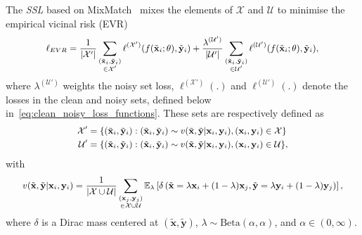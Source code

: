 \documentclass[review]{elsarticle}
\begin{document}
The \textit{SSL} based on MixMatch~\cite{berthelot2019mixmatch} mixes the elements of $\mathcal{X}$ and $\mathcal{U}$ to minimise the empirical vicinal risk (EVR)~\cite{zhang2017mixup}
\begin{equation}
\small
\begin{split}
\ell_{EVR} =  \frac{1}{|\mathcal{X}'|}\sum_{\substack{(\tilde{\mathbf{x}}_i,\tilde{\mathbf{y}}_i) \\ \in \mathcal{X}'}} \ell^{(\mathcal{X}')}(f(\tilde{\mathbf{x}}_i;\theta),\tilde{\mathbf{y}}_i) + 
 \frac{\lambda^{(\mathcal{U}')}}{|\mathcal{U}'|}\sum_{\substack{(\tilde{\mathbf{x}}_i,\tilde{\mathbf{y}}_i) \\ \in \mathcal{U}'}} \ell^{(\mathcal{U}')}(f(\tilde{\mathbf{x}}_i;\theta),\tilde{\mathbf{y}}_i),
\end{split}
\label{eq:EVR}
\end{equation}
where $\lambda^{(\mathcal{U}')}$ weights the noisy set loss, $\ell^{(\mathcal{X}')}(.)$ and $\ell^{(\mathcal{U}')}(.)$ denote the losses in the clean and noisy sets, defined below in~\eqref{eq:clean_noisy_loss_functions}.  These sets are respectively defined as
\begin{equation}
\small
    \begin{split}
        \mathcal{X}' &= \{ (\tilde{\mathbf{x}}_i,\tilde{\mathbf{y}}_i ) : (\tilde{\mathbf{x}}_i,\tilde{\mathbf{y}}_i ) \sim v(\tilde{\mathbf{x}},\tilde{\mathbf{y}}|\mathbf{x}_i,\mathbf{y}_i), (\mathbf{x}_i,\mathbf{y}_i) \in \mathcal{X}\} \\
        \mathcal{U}' &= \{ (\tilde{\mathbf{x}}_i,\tilde{\mathbf{y}}_i ) : (\tilde{\mathbf{x}}_i,\tilde{\mathbf{y}}_i ) \sim v(\tilde{\mathbf{x}},\tilde{\mathbf{y}}|\mathbf{x}_i,\mathbf{y}_i), (\mathbf{x}_i,\mathbf{y}_i) \in \mathcal{U}\},
    \end{split}
    \label{eq:X_prime_U_prime}
\end{equation}
with
\begin{equation}
\small 
\begin{split}
    v(\tilde{\mathbf{x}},\tilde{\mathbf{y}}|\mathbf{x}_i,\mathbf{y}_i) = \frac{1}{|\mathcal{X} \cup \mathcal{U}|}  \sum_{\substack{(\mathbf{x}_j,\mathbf{y}_j) \\ \in \mathcal{X} \cup \mathcal{U}}} \mathbb{E}_{\lambda} \left [ \delta \left ( \tilde{\mathbf{x}} = \lambda \mathbf{x}_i+(1-\lambda)\mathbf{x}_j,\tilde{\mathbf{y}}=\lambda \mathbf{y}_i + (1-\lambda)\mathbf{y}_j \right ) \right ],
    \end{split}
    \label{eq:v_x_y}
\end{equation}
where $\delta$ is a Dirac mass centered at $(\tilde{\mathbf{x}},\tilde{\mathbf{y}})$, $\lambda \sim \text{Beta}(\alpha,\alpha)$, and $\alpha \in (0,\infty)$.
\end{document}
